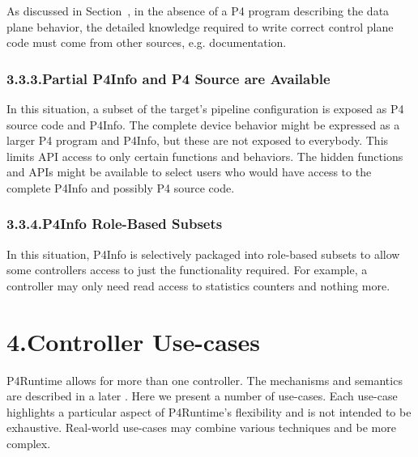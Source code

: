 \documentclass[11pt]{article}
\begin{document}
{%
\noindent{}As discussed in Section~, in the
absence of a P4 program describing the data plane behavior, the detailed
knowledge required to write correct control plane code must come from other
sources, e.g. documentation.%

\subsubsection{3.3.3.\hspace*{0.5em}Partial P4Info and P4 Source are Available}\label{sec-partial-p4info-and-p4-source-are-available}%

\noindent{}In this situation, a subset of the target's pipeline configuration is exposed as
P4 source code and P4Info. The complete device behavior might be expressed as a
larger P4 program and P4Info, but these are not exposed to everybody. This
limits API access to only certain functions and behaviors. The hidden functions
and APIs might be available to select users who would have access to the
complete P4Info and possibly P4 source code.%

\subsubsection{3.3.4.\hspace*{0.5em}P4Info Role-Based Subsets}\label{sec-p4info-role-based-subsets}%

\noindent{}In this situation, P4Info is selectively packaged into role-based subsets to
allow some controllers access to just the functionality required. For example, a
controller may only need read access to statistics counters and nothing more.%

\section{4.\hspace*{0.5em}Controller Use-cases}\label{sec-controller-use-cases}%

\noindent{}P4Runtime allows for more than one controller. The mechanisms and semantics are
described in a later
. Here we
present a number of use-cases. Each use-case highlights a particular aspect of
P4Runtime's flexibility and is not intended to be exhaustive. Real-world
use-cases may combine various techniques and be more complex.%

}
\end{document}
